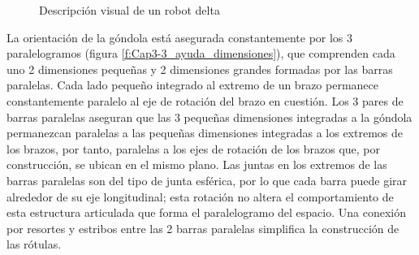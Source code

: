     \vspace{-1em}

    \begin{figure}[h]
         \centering
         \caption{Descripción visual de un robot delta \cite{Clavel:31403}}
    \end{figure}

    La orientación de la góndola está asegurada constantemente por los 3 paralelogramos (figura \eqref{f:Cap3-3_ayuda_dimensiones}), que comprenden cada uno 2 dimensiones pequeñas y 2 dimensiones grandes formadas por las barras paralelas. Cada lado pequeño integrado al extremo de un brazo permanece constantemente paralelo al eje de rotación del brazo en cuestión. Los 3 pares de barras paralelas aseguran que las 3 pequeñas dimensiones integradas a la góndola permanezcan paralelas a las pequeñas dimensiones integradas a los extremos de los brazos, por tanto, paralelas a los ejes de rotación de los brazos que, por construcción, se ubican en el mismo plano. Las juntas en los extremos de las barras paralelas son del tipo de junta esférica, por lo que cada barra puede girar alrededor de su eje longitudinal; esta rotación no altera el comportamiento de esta estructura articulada que forma el paralelogramo del espacio. Una conexión por resortes y estribos entre las 2 barras paralelas simplifica la construcción de las rótulas.
    
